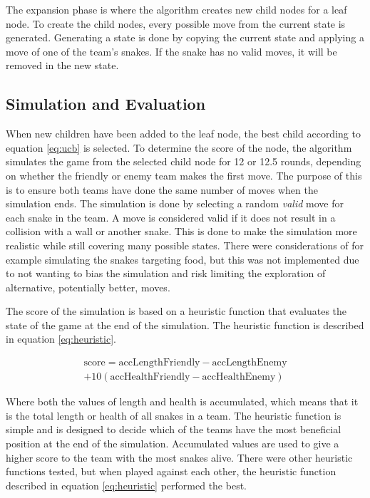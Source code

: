 \documentclass[a4paper,12pt]{article}
\begin{document}
The expansion phase is where the algorithm creates new child nodes for a leaf node. To create the child nodes, every possible move from the current state is generated. Generating a state is done by copying the current state and applying a move of one of the team's snakes. If the snake has no valid moves, it will be removed in the new state. 



\subsection{Simulation and Evaluation}

When new children have been added to the leaf node, the best child according to equation \ref{eq:ucb} is selected. To determine the score of the node, the algorithm simulates the game from the selected child node for 12 or 12.5 rounds, depending on whether the friendly or enemy team makes the first move. The purpose of this is to ensure both teams have done the same number of moves when the simulation ends. The simulation is done by selecting a random \textit{valid} move for each snake in the team. A move is considered valid if it does not result in a collision with a wall or another snake. This is done to make the simulation more realistic while still covering many possible states. There were considerations of for example simulating the snakes targeting food, but this was not implemented due to not wanting to bias the simulation and risk limiting the exploration of alternative, potentially better, moves.


The score of the simulation is based on a heuristic function that evaluates the state of the game at the end of the simulation. The heuristic function is described in equation \ref{eq:heuristic}.


\begin{multline} \label{eq:heuristic}
    \text{score} = \text{accLengthFriendly} - \text{accLengthEnemy}\\ + 10 (\text{accHealthFriendly} - \text{accHealthEnemy})
\end{multline}

Where both the values of length and health is accumulated, which means that it is the total length or health of all snakes in a team. The heuristic function is simple and is designed to decide which of the teams have the most beneficial position at the end of the simulation. Accumulated values are used to give a higher score to the team with the most snakes alive. There were other heuristic functions tested, but when played against each other, the heuristic function described in equation \ref{eq:heuristic} performed the best.
\end{document}
